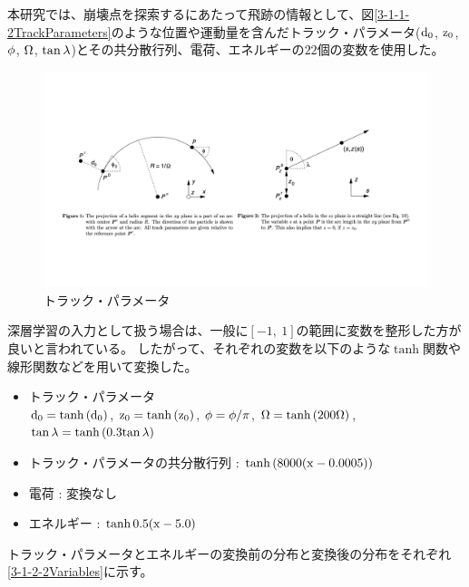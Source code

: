 本研究では、崩壊点を探索するにあたって飛跡の情報として、図\ref{3-1-1-2TrackParameters}のような位置や運動量を含んだトラック・パラメータ($\rm d_0$, $\rm z_0$, $\rm \phi$, $\rm \Omega$, $\rm \tan{\lambda}$)\cite{TrackParametersLCIO}とその共分散行列、電荷、エネルギーの$22$個の変数を使用した。

\begin{figure}[htbp]
 \centering
 \includegraphics[trim = 50 150 50 250, width=1.0\textwidth, clip]{Figure/3Networks/3-1-2-1TrackParameters.png}
 \caption{トラック・パラメータ\cite{TrackParametersLCIO}}
 \label{3-1-2-1TrackParameters}
\end{figure}

深層学習の入力として扱う場合は、一般に$[-1,\ 1]$の範囲に変数を整形した方が良いと言われている。
したがって、それぞれの変数を以下のような$\tanh$関数や線形関数などを用いて変換した。

\begin{itemize}
 \item トラック・パラメータ\\
 ${\rm d_0} = \tanh{({\rm d_0})}$,
 ${\rm z_0} = \tanh{({\rm z_0})}$,
 ${\rm \phi} = {\rm \phi}/\pi$,
 ${\rm \Omega} = \tanh{(200{\rm \Omega})}$,
 ${\rm \tan{\lambda}} = \tanh{(0.3{\rm \tan{\lambda}})}$
 \item トラック・パラメータの共分散行列 : $\tanh{(8000({\rm x}-0.0005))}$
 \item 電荷 : 変換なし
 \item エネルギー : $\tanh{0.5({\rm x}-5.0)}$
\end{itemize}

トラック・パラメータとエネルギーの変換前の分布と変換後の分布をそれぞれ\ref{3-1-2-2Variables}に示す。

